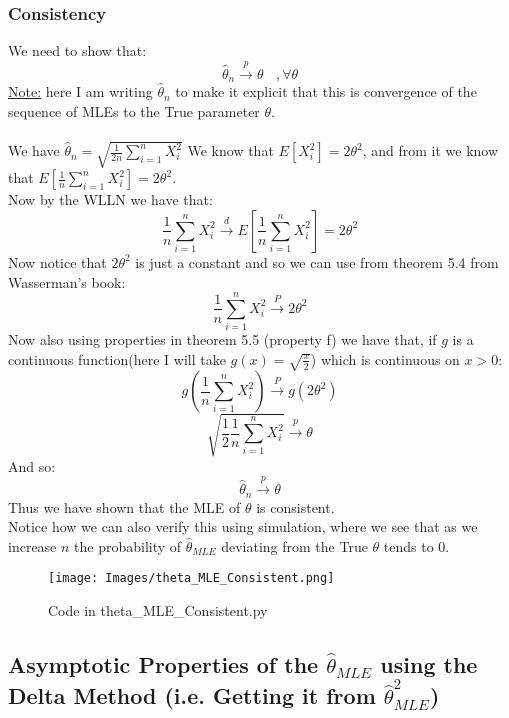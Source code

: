 \documentclass[12pt]{article}
\begin{document}
\subsubsection*{Consistency}
We need to show that: 
\[
\hat{\theta}_{n} \xrightarrow{p} \theta \ \ \ \ , \forall \theta
\]
\underline{Note:} here I am writing $\hat{\theta}_n$ to make it explicit that this is convergence of the sequence of MLEs to the True parameter $\theta$.\\ \\
We have $\hat{\theta}_n = \sqrt{\frac{1}{2n}\sum_{i=1}^{n}X_i^2}$
We know that $E[X_i^2] = 2\theta^2$, and from it we know that $E[\frac{1}{n}\sum_{i=1}^{n}X_i^2] = 2\theta^2$. \\ 
Now by the WLLN we have that: 
\[
  \frac{1}{n}\sum_{i=1}^{n}X_i^2 \xrightarrow{d} E[\frac{1}{n}\sum_{i=1}^{n}X_i^2] = 2\theta^2
\]
Now notice that $2\theta^2$ is just a constant and so we can use from theorem 5.4 from Wasserman's book: 
\[
  \frac{1}{n}\sum_{i=1}^{n}X_i^2 \xrightarrow{P} 2\theta^2
\]
Now also using properties in theorem 5.5  (property f)  we have that, if $g$ is a continuous function(here I will take $g(x) =\sqrt{\frac{x}{2}}$) which is continuous on $x>0$:
\[
  g(\frac{1}{n}\sum_{i=1}^{n}X_i^2) \xrightarrow{P} g(2\theta^2)
\]
\[
\sqrt{\frac{1}{2}\frac{1}{n}\sum_{i=1}^{n}X_i^2} \xrightarrow{p} \theta
\]
And so: 
\[
\hat{\theta}_n \xrightarrow{p} \theta
\]
Thus we have shown that the MLE of $\theta$ is consistent.
\\
Notice how we can also verify this using simulation, where we see that as we increase $n$ the probability of $\hat{\theta}_{MLE}$ deviating from the True $\theta$ tends to 0.
\begin{figure}[H]
  \centering
  \texttt{[image: Images/theta\_MLE\_Consistent.png]}
  \caption{Code in theta\_MLE\_Consistent.py}
\end{figure}
\subsection*{Asymptotic Properties of the $\hat{\theta}_{MLE}$ using the Delta Method (i.e. Getting it from $\hat{\theta}^2_{MLE}$)}
\end{document}
